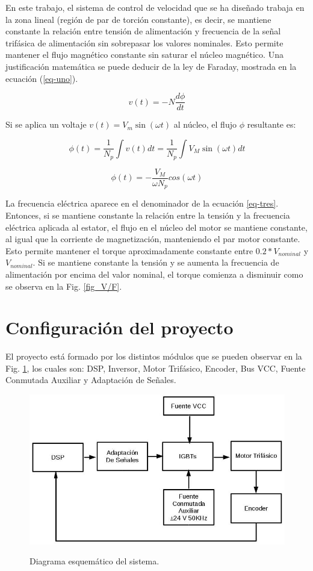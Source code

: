 \documentclass[conference]{IEEEtran}
\begin{document}
En este trabajo, el sistema de control de velocidad que se ha diseñado trabaja en la zona lineal (región de par de torción constante), es decir, se mantiene constante la relación entre tensión de alimentación y frecuencia de la señal trifásica de alimentación sin sobrepasar los valores nominales. Esto permite mantener el flujo magnético constante sin saturar el núcleo magnético. Una justificación matemática se puede deducir de la ley de Faraday, mostrada en la ecuación (\ref{eq-uno}).

\begin{equation}
v\left( t\right)=-N\dfrac{d\phi}{dt}\label{eq-uno}
\end{equation}

Si se aplica un voltaje 
$v\left(t\right) = V_{m}\sin(\omega t)$ 
al núcleo, el flujo $\phi$ resultante es:

\begin{equation}
\phi (t)=\frac { 1 }{ { N }_{ p } } \int { v(t)dt }= \frac { 1 }{ { N }_{ p } } \int { { V }_{ M }\sin { (\omega t)} dt } 
\end{equation}

\begin{equation}
\phi(t)=-\frac { { V }_{ M } }{ \omega{ N }_{ p } } cos(\omega t)\label{eq-tres}
\end{equation}

La frecuencia eléctrica aparece en el denominador de la ecuación \ref{eq-tres}. Entonces, si se mantiene constante la relación entre la tensión y la frecuencia eléctrica aplicada al estator, el flujo en el núcleo del motor se mantiene constante, al igual que la corriente de magnetización, manteniendo el par motor constante. Esto permite mantener el torque aproximadamente constante entre $0.2*{V}_{nominal}$ y ${V}_{nominal}$. Si se mantiene constante la tensión y se aumenta la frecuencia de alimentación por encima del valor nominal, el torque comienza a disminuir como se observa en la Fig. \ref{fig_V/F}.


\section{Configuración del proyecto}

El proyecto está formado por los distintos módulos que se pueden observar en la Fig. \ref{fig_esq}, los cuales son: DSP, Inversor, Motor Trifásico, Encoder, Bus VCC, Fuente Conmutada Auxiliar y Adaptación de Señales.

\begin{figure}[!t]
\centering
\includegraphics[width=8 cm]{figuras/figura_09.jpeg} \\
\caption{Diagrama esquemático del sistema.} 
\label{fig_esq}
\end{figure}
\end{document}

